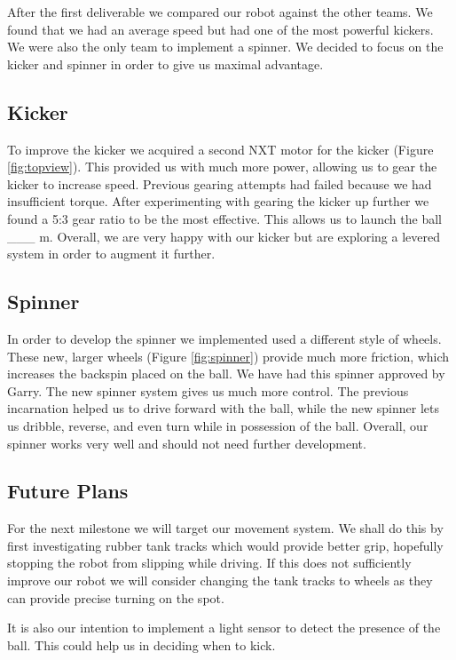 \documentclass[12pt, a4paper, titlepage]{article}
\begin{document}
After the first deliverable we compared our robot against the other teams. We
found that we had an average speed but had one of the most powerful kickers.
We were also the only team to implement a spinner. We decided to focus on the
kicker and spinner in order to give us maximal advantage.

\subsection{Kicker}

To improve the kicker we acquired a second NXT motor for the kicker (Figure
\ref{fig:topview}). This provided us with much more power, allowing us to gear
the kicker to increase speed. Previous gearing attempts had failed because we
had insufficient torque. After experimenting with gearing the kicker up further
we found a 5:3 gear ratio to be the most effective. This allows us to launch the
ball \_\_\_ m. Overall, we are very happy with our kicker but are exploring a
levered system in order to augment it further.

\subsection{Spinner}

In order to develop the spinner we implemented used a different style of wheels.
These new, larger wheels (Figure \ref{fig:spinner}) provide much more friction,
which increases the backspin placed on the ball. We have had this spinner
approved by Garry. The new spinner system gives us much more control. The
previous incarnation helped us to drive forward with the ball, while the new
spinner lets us dribble, reverse, and even turn while in possession of the ball.
Overall, our spinner works very well and should not need further development.

\subsection{Future Plans}

For the next milestone we will target our movement system. We shall do this
by first investigating rubber tank tracks which would provide better grip,
hopefully stopping the robot from slipping while driving. If this does not
sufficiently improve our robot we will consider changing the tank tracks to
wheels as they can provide precise turning on the spot.

It is also our intention to implement a light sensor to detect the presence of
the ball. This could help us in deciding when to kick.
\end{document}
